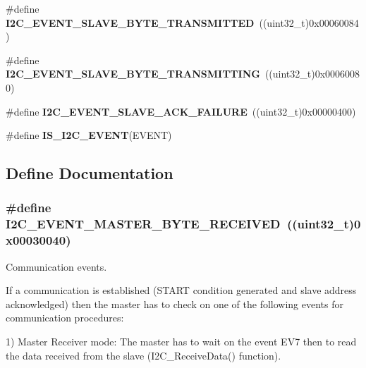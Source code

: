 \begin{DoxyCompactItemize}
\item 
\hypertarget{group__I2C__Events_ga50652880323b8c2746b5afbdfea03fe1}{
\#define {\bfseries I2C\_\-EVENT\_\-SLAVE\_\-BYTE\_\-TRANSMITTED}~((uint32\_\-t)0x00060084)}
\label{group__I2C__Events_ga50652880323b8c2746b5afbdfea03fe1}

\item 
\hypertarget{group__I2C__Events_gaa574c93a99497649f3d8e7ff53796231}{
\#define {\bfseries I2C\_\-EVENT\_\-SLAVE\_\-BYTE\_\-TRANSMITTING}~((uint32\_\-t)0x00060080)}
\label{group__I2C__Events_gaa574c93a99497649f3d8e7ff53796231}

\item 
\hypertarget{group__I2C__Events_ga249bd611f1ca64653c0bfc606c591088}{
\#define {\bfseries I2C\_\-EVENT\_\-SLAVE\_\-ACK\_\-FAILURE}~((uint32\_\-t)0x00000400)}
\label{group__I2C__Events_ga249bd611f1ca64653c0bfc606c591088}

\item 
\#define {\bfseries IS\_\-I2C\_\-EVENT}(EVENT)
\end{DoxyCompactItemize}


\subsection{Define Documentation}
\hypertarget{group__I2C__Events_ga6bcf2ae49961e07e27cf9fdf334719e3}{
\subsubsection[{I2C\_\-EVENT\_\-MASTER\_\-BYTE\_\-RECEIVED}]{\setlength{\rightskip}{0pt plus 5cm}\#define I2C\_\-EVENT\_\-MASTER\_\-BYTE\_\-RECEIVED~((uint32\_\-t)0x00030040)}}
\label{group__I2C__Events_ga6bcf2ae49961e07e27cf9fdf334719e3}


Communication events. 

If a communication is established (START condition generated and slave address acknowledged) then the master has to check on one of the following events for communication procedures:

1) Master Receiver mode: The master has to wait on the event EV7 then to read the data received from the slave (I2C\_\-ReceiveData() function).

